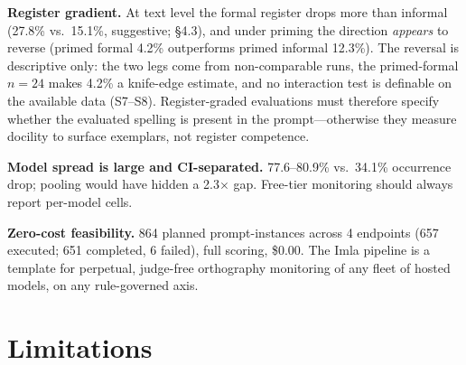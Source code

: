 \documentclass[11pt]{article}
\begin{document}
\textbf{Register gradient.} At text level the formal register drops more than informal (27.8\% vs.\ 15.1\%, suggestive; \S4.3), and under priming the direction \emph{appears} to reverse (primed formal 4.2\% outperforms primed informal 12.3\%). The reversal is descriptive only: the two legs come from non-comparable runs, the primed-formal $n{=}24$ makes 4.2\% a knife-edge estimate, and no interaction test is definable on the available data (S7--S8). Register-graded evaluations \cite{turkbench2026} must therefore specify whether the evaluated spelling is present in the prompt---otherwise they measure docility to surface exemplars, not register competence.

\textbf{Model spread is large and CI-separated.} 77.6--80.9\% vs.\ 34.1\% occurrence drop; pooling would have hidden a 2.3$\times$ gap. Free-tier monitoring should always report per-model cells.

\textbf{Zero-cost feasibility.} 864 planned prompt-instances across 4 endpoints (657 executed; 651 completed, 6 failed), full scoring, \$0.00. The Imla pipeline is a template for perpetual, judge-free orthography monitoring of any fleet of hosted models, on any rule-governed axis.

\section{Limitations}
\end{document}
